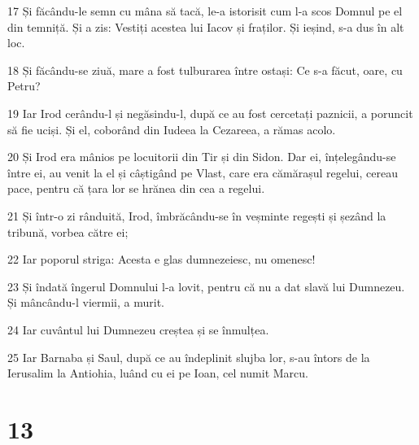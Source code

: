 \par 17 Și făcându-le semn cu mâna să tacă, le-a istorisit cum l-a scos Domnul pe el din temniță. Și a zis: Vestiți acestea lui Iacov și fraților. Și ieșind, s-a dus în alt loc.
\par 18 Și făcându-se ziuă, mare a fost tulburarea între ostași: Ce s-a făcut, oare, cu Petru?
\par 19 Iar Irod cerându-l și negăsindu-l, după ce au fost cercetați paznicii, a poruncit să fie uciși. Și el, coborând din Iudeea la Cezareea, a rămas acolo.
\par 20 Și Irod era mânios pe locuitorii din Tir și din Sidon. Dar ei, înțelegându-se între ei, au venit la el și câștigând pe Vlast, care era cămărașul regelui, cereau pace, pentru că țara lor se hrănea din cea a regelui.
\par 21 Și într-o zi rânduită, Irod, îmbrăcându-se în veșminte regești și șezând la tribună, vorbea către ei;
\par 22 Iar poporul striga: Acesta e glas dumnezeiesc, nu omenesc!
\par 23 Și îndată îngerul Domnului l-a lovit, pentru că nu a dat slavă lui Dumnezeu. Și mâncându-l viermii, a murit.
\par 24 Iar cuvântul lui Dumnezeu creștea și se înmulțea.
\par 25 Iar Barnaba și Saul, după ce au îndeplinit slujba lor, s-au întors de la Ierusalim la Antiohia, luând cu ei pe Ioan, cel numit Marcu.

\chapter{13}

